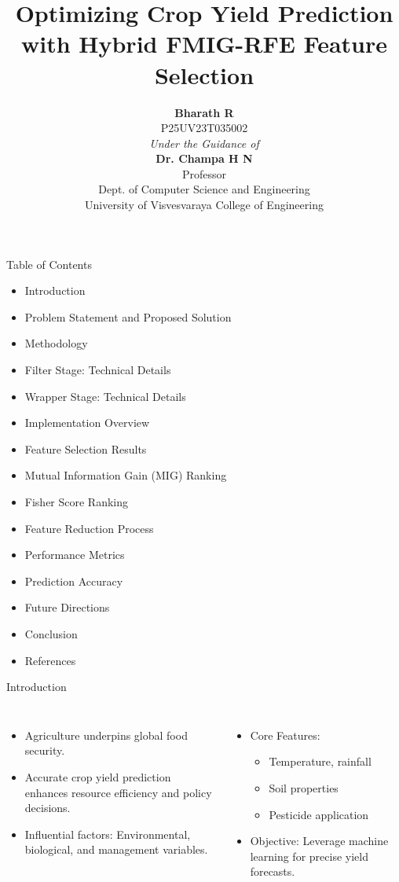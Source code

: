 \documentclass{beamer}
\title[Presentation]{\textbf{Optimizing Crop Yield Prediction with Hybrid FMIG-RFE Feature Selection}}
\author[Bharath R]{\textbf{Bharath R}\\ \scriptsize{P25UV23T035002} \\ \vspace{1.6cm} \textit{Under the Guidance of} \\ \textbf{\normalsize Dr. Champa H N}\\ \scriptsize{ Professor \\Dept. of Computer Science and Engineering\\University of Visvesvaraya College of Engineering}}
\begin{document}
\maketitle

\begin{frame}{Table of Contents}
    \begin{itemize}
        \item Introduction
        \item Problem Statement and Proposed Solution
        \item Methodology
        \item Filter Stage: Technical Details
        \item Wrapper Stage: Technical Details
        \item Implementation Overview
        \item Feature Selection Results
        \item Mutual Information Gain (MIG) Ranking
        \item Fisher Score Ranking
        \item Feature Reduction Process
        \item Performance Metrics
        \item Prediction Accuracy
        \item Future Directions
        \item Conclusion
        \item References
    \end{itemize}
\end{frame}

\begin{frame}{Introduction}
    \begin{columns}[T]
        \begin{itemize}
            \item Agriculture underpins global food security.
            \item Accurate crop yield prediction enhances resource efficiency and policy decisions.
            \item Influential factors: Environmental, biological, and management variables.
        \end{itemize}
        \begin{itemize}
            \item Core Features:
                \begin{itemize}
                    \item Temperature, rainfall
                    \item Soil properties
                    \item Pesticide application
                \end{itemize}
            \item Objective: Leverage machine learning for precise yield forecasts.
        \end{itemize}
    \end{columns}
\end{frame}
\end{document}

